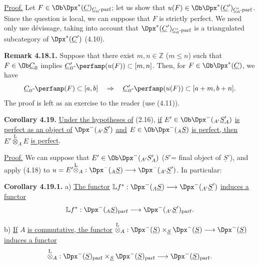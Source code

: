 \uline{Proof.} Let \(F\in\Ob\Dpx^*(\underline{C})_{\underline{C}_0\text{-}\mathrm{parf}}\); let us show that \(u(F)\in\Ob\Dpx^*(\underline{C}')_{\underline{C}'_0\text{-}\mathrm{parf}}\). Since the question is local, we can suppose that \(F\) is strictly perfect. We need only use dévissage, taking into account that \(\Dpx^*(\underline{C}')_{\underline{C}'_0\text{-}\mathrm{parf}}\) is a triangulated subcategory of \(\Dpx^*(\underline{C}')\) (4.10).

\textbf{Remark 4.18.1.} Suppose that there exist \(m,n\in\mathbb Z\) (\(m\leq n\)) such that \(F\in\Ob\underline{C}_0\) implies \(\underline{C}'_0\text{-}\perfamp(u(F))\subset[m,n]\). Then, for \(F\in\Ob\Dpx^*(\underline{C})\), we have
\[
  \underline{C}_0\text{-}\perfamp(F)
  \subset[a,b]
  \quad\Rightarrow\quad
  \underline{C}'_0\text{-}\perfamp(u(F))
  \subset[a+m,b+n].
\]
The proof is left as an exercise to the reader (use (4.11)).

\textbf{Corollary 4.19.} \uline{Under the hypotheses of} (2.16), \uline{if} \(E'\in\Ob\Dpx^-({}_{A'} \underline{S}'_A)\) \uline{is perfect as an object of} \(\Dpx^-({}_{A'} \underline{S}')\) \uline{and} \(E\in\Ob\Dpx^-({}_A \underline{S})\) \uline{is perfect, then}
\(E'\overset{\mathrm L}{\otimes}_A E\) \uline{is perfect}.

\uline{Proof.} We can suppose that \(E'\in\Ob\Dpx^-({}_{A'} S'_A)\) (\(S'\)= final object of \(\underline{S}'\)), and apply (4.18) to
\(u=E'\overset{\mathrm L}{\otimes}_A:\Dpx^-({}_A \underline{S})\longrightarrow \Dpx^-({}_{A'} \underline{S}')\).
In particular:

%
\textbf{Corollary 4.19.1.} a) \uline{The functor}
\(\mathbb L f^*:\Dpx^-({}_A \underline{S})\longrightarrow \Dpx^-({}_{A'} \underline{S}')\)
\uline{induces a functor}
\[
  \mathbb L f^*:\Dpx^-({}_A \underline{S})_{\mathrm{parf}}
  \longrightarrow
  \Dpx^-({}_{A'} \underline{S}')_{\mathrm{parf}}.
\]

b) \uline{If} \(A\) \uline{is commutative, the functor}
\(\overset{\mathrm L}{\otimes}_A:\Dpx^-(\underline{S})\times_{\underline{S}}\Dpx^-(\underline{S})\longrightarrow \Dpx^-(\underline{S})\)
\uline{induces a functor}
\[
  \overset{\mathrm L}{\otimes}_A:
  \Dpx^-(\underline{S})_{\mathrm{parf}}\times_{\underline{S}}\Dpx^-(\underline{S})_{\mathrm{parf}}
  \longrightarrow \Dpx^-(\underline{S})_{\mathrm{parf}}.
\]

